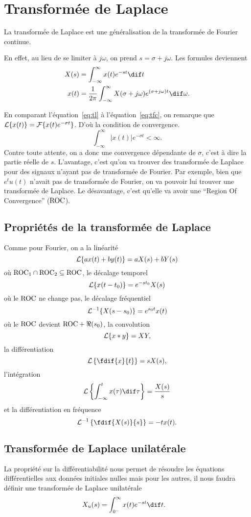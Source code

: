 \section{Transformée de Laplace}
La transformée de Laplace est une généralisation de la transformée de Fourier
continue.

En effet, au lieu de se limiter à $j\omega$, on prend $s = \sigma + j\omega$.
Les formules deviennent
\begin{align}
  \label{eq:tl}
  X(s) & = \int_{-\infty}^\infty x(t) e^{-st} \dif t\\
  \nonumber
  x(t) & = \frac{1}{2\pi}\int_{-\infty}^\infty X(\sigma+j\omega)
  e^{(\sigma+j\omega)t} \dif \omega.
\end{align}

En comparant l'équation~\ref{eq:tl} à l'équation~\ref{eq:tfc}, on remarque que
$\mathcal{L}\{x(t)\} = \mathcal{F}\{x(t) e^{-\sigma t}\}$.
D'où la condition de convergence.
\[ \int_{-\infty}^\infty |x(t)|e^{-\sigma t} < \infty. \]
Contre toute attente, on a donc une convergence dépendante de $\sigma$, c'est
à dire la partie réelle de $s$.
L'avantage, c'est qu'on va trouver des transformée de Laplace pour des
signaux n'ayant pas de transformée de Fourier.
Par exemple, bien que $e^tu(t)$ n'avait pas de transformée de Fourier,
on va pouvoir lui trouver une transformée de Laplace.
Le désavantage, c'est qu'elle va avoir une ``Region Of Convergence'' ($\mathrm{ROC}$).

\subsection{Propriétés de la transformée de Laplace}
Comme pour Fourier, on a la linéarité
\[ \mathcal{L}\{ax(t)+by(t)\} = aX(s) + bY(s) \]
où $\mathrm{ROC}_1 \cap \mathrm{ROC}_2 \subseteq \mathrm{ROC}$,
le décalage temporel
\[ \mathcal{L}\{x(t-t_0)\} = e^{-st_0}X(s) \]
où le $\mathrm{ROC}$ ne change pas,
le décalage fréquentiel
\[ \mathcal{L}^{-1}\{X(s-s_0)\} = e^{s_0t}x(t) \]
où le $\mathrm{ROC}$ devient $\mathrm{ROC} + \Re(s_0)$,
la convolution
\[ \mathcal{L}\{x*y\} = XY, \]
la différentiation
\[ \laplace\left\{\fdif{x}{t}\right\} = sX(s), \]
l'intégration
\[ \laplace\left\{\int_{-\infty}^tx(\tau)\dif\tau\right\} = \frac{X(s)}{s} \]
et la différentiation en fréquence
\[ \laplace^{-1}\left\{\fdif{X(s)}{s}\right\} = -tx(t). \]

\subsection{Transformée de Laplace unilatérale}
\label{sec:laplacu}
La propriété sur la différentiabilité nous permet de résoudre les équations
différentielles aux données initiales nulles mais pour les autres,
il nous faudra définir une transformée de Laplace unilatérale
\begin{align*}
  X_u(s) & = \int_{0^-}^\infty x(t) e^{-st} \dif t.
\end{align*}

